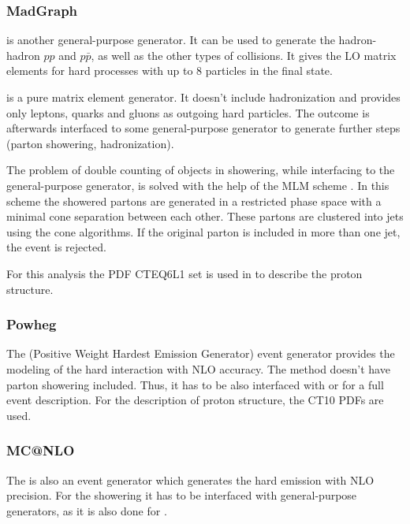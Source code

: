 \subsubsection{MadGraph}

\MG\cite{Alwall:2011uj} is another general-purpose generator. It can be used to generate the hadron-hadron $pp$ and $p\bar{p}$, as well as the other types of collisions.
It gives the LO matrix elements for hard processes with up to 8 particles in the final state. 

\MG is a pure matrix element generator. It doesn't include hadronization and provides only leptons, quarks and gluons as outgoing hard particles. 
The outcome is afterwards interfaced to some general-purpose generator to generate further steps (parton showering, hadronization). 

The problem of double counting of objects in showering, while interfacing \MG to the general-purpose generator, is solved with the help of the 
MLM scheme \cite{Mrenna:2003if}. In this scheme the showered partons are generated in a restricted phase space with a minimal cone separation
between each other. These partons are clustered into jets using the cone algorithms. If the original parton is included in more than one jet,
the event is rejected.

For this analysis the PDF CTEQ6L1 set \cite{Pumplin:2002vw} is used in \MG to describe the proton structure.

\subsubsection{Powheg}

The \Powheg (Positive Weight Hardest Emission Generator) event generator \cite{Frixione:2007vw} provides the modeling of the hard interaction 
with NLO accuracy. The \Powheg method doesn't have parton showering included. Thus, it has to be also interfaced with \PYTHIA or
\HERWIG for a full event description. For the description of proton structure, the CT10 \cite{Lai:2010vv} PDFs are used.

\subsubsection{MC@NLO}

The \MCNLO \cite{Frixione:2002ik} is also an event generator which generates the hard emission with NLO precision. For the showering
it has to be interfaced with general-purpose generators, as it is also done for \Powheg. 

